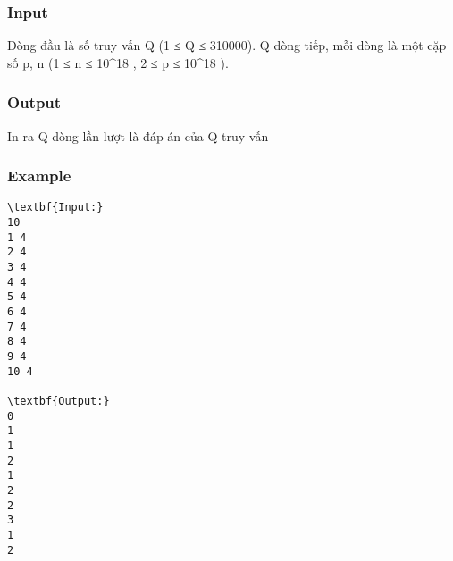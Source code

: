 \subsubsection{   Input  }

   Dòng đầu là số truy vấn Q (1 ≤ Q ≤ 310000). Q dòng tiếp, mỗi dòng là một cặp số p, n (1 ≤ n ≤ 10^18 , 2 ≤ p ≤ 10^18 ).  

\subsubsection{   Output  }

   In ra Q dòng lần lượt là đáp án của Q truy vấn  

\subsubsection{   Example  }
\begin{verbatim}
\textbf{Input:}
10
1 4
2 4
3 4
4 4
5 4
6 4
7 4
8 4
9 4
10 4

\textbf{Output:}
0
1
1
2
1
2
2
3
1
2
\end{verbatim}
